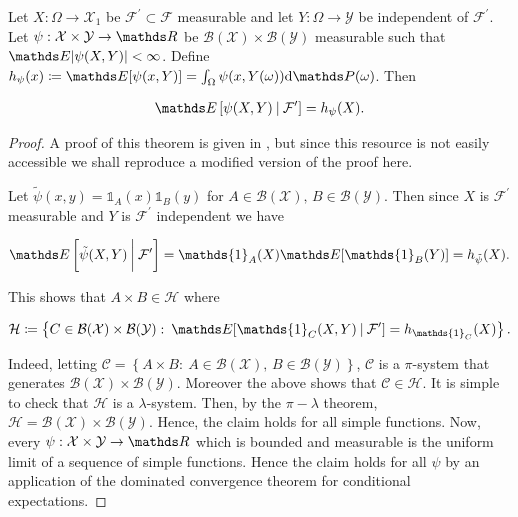 \begin{proposition} 
Let $X: \Omega \rightarrow \mathcal{X}_1$ be $\mathcal{F}^\prime \subset \mathcal{F}$ measurable and let $Y: \Omega \rightarrow \mathcal{Y}$ be independent of $\mathcal{F}^\prime$. Let $\psi: \mathcal{X}\times \mathcal{Y} \rightarrow \bR$ be $\mathcal{B}(\mathcal{X}) \times \mathcal{B}(\mathcal{Y})$ measurable such that $\bE \abs{\psi(X,Y)} < \infty$. Define $h_\psi(x) \coloneqq \bE[\psi(x,Y)] = \int_\Omega \psi(x,Y(\omega)) \rmd\bP(\omega)$. Then 

\begin{align}
\bE\left[\psi(X,Y) \: \lvert \: \mathcal{F}^\prime\right] = h_\psi(X).
\end{align}
\end{proposition}

\begin{proof}
A proof of this theorem is given in \cite{XueMeiAltman2020}, but since this resource is not easily accessible we shall reproduce a modified version of the proof here. 

Let $\tilde{\psi}(x,y) = \mathds{1}_{A}(x)\mathds{1}_{B}(y)$ for $A \in \mathcal{B}(\mathcal{X}), \,B \in \mathcal{B}(\mathcal{Y}) $. Then since $X$ is $\mathcal{F}^\prime$ measurable and $Y$ is $\mathcal{F}^\prime$ independent we have 

\begin{align}
\bE\left[\tilde{\psi}(X,Y) \: \bigg\lvert \: \mathcal{F}^\prime\right] = \mathds{1}_A(X)\bE[\mathds{1}_B(Y)] = h_{\tilde{\psi}}(X).
\end{align}

This shows that $A \times B \in \mathcal{H}$ where 

\begin{align}
\mathcal{H} \coloneqq \left \{C \in \mathcal{B}(\mathcal{X})\times \mathcal{B}(\mathcal{Y}): \: \bE[\mathds{1}_C(X,Y) \: | \: \mathcal{F}^\prime] = h_{\mathds{1}_C}(X)  \right\}.
\end{align}

Indeed, letting $\mathcal{C} = \left\{A \times B: \: A \in \mathcal{B}(\mathcal{X}), \,B \in \mathcal{B}(\mathcal{Y})\right\}$, $\mathcal{C}$ is a $\pi$-system that generates $\mathcal{B}(\mathcal{X})\times \mathcal{B}(\mathcal{Y})$. Moreover the above shows that $\mathcal{C} \in \mathcal{H}$. It is simple to check that $\mathcal{H}$ is a $\lambda$-system. Then, by the $\pi-\lambda$ theorem, $\mathcal{H} = \mathcal{B}(\mathcal{X})\times \mathcal{B}(\mathcal{Y})$. Hence, the claim holds for all simple functions. Now, every $\psi: \mathcal{X}\times \mathcal{Y} \rightarrow \bR$ which is bounded and measurable is the uniform limit of a sequence of simple functions. Hence the claim holds for all $\psi$ by an application of the dominated convergence theorem for conditional expectations. 

\end{proof}

